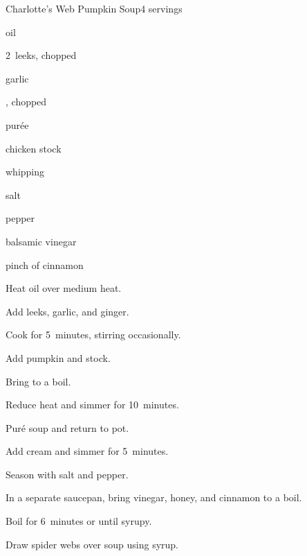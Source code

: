 \begin{recipe}{Charlotte's Web Pumpkin Soup}{}{4 servings}

\begin{ingredients}
\item {} oil
\item 2~leeks, chopped
\item {} garlic
\item {} , chopped
\item {}  pur\'ee
\item {} chicken stock
\item \C{\quarter} whipping 
\item salt
\item pepper
\item \C{\half} balsamic vinegar
\item {} 
\item pinch of cinnamon
\end{ingredients}

\begin{directions}
\item Heat oil over medium heat.
\item Add leeks, garlic, and ginger.
\item Cook for 5~minutes, stirring occasionally.
\item Add pumpkin and stock.
\item Bring to a boil.
\item Reduce heat and simmer for 10~minutes.
\item Pur\'e soup and return to pot.
\item Add cream and simmer for 5~minutes.
\item Season with salt and pepper.
\item In a separate saucepan, bring vinegar, honey, and cinnamon to a boil.
\item Boil for 6~minutes or until syrupy.
\item Draw spider webs over soup using syrup.
\end{directions}

\end{recipe}
